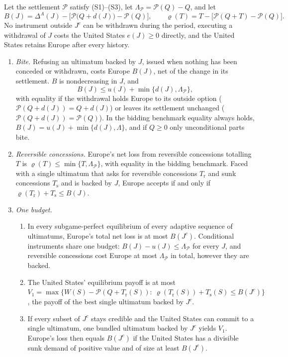 \begin{proposition}\label{prop:slack}
Let the settlement $\mathcal P$ satisfy (S1)--(S3), let $\Lambda_{\mathcal P}=\mathcal P(Q)-Q$, and let
\[
B(J)=\Delta^A(J)-\big[\mathcal P\big(Q+d(J)\big)-\mathcal P(Q)\big],\qquad \varrho(T)=T-\big[\mathcal P(Q+T)-\mathcal P(Q)\big].
\]
No instrument outside $J^c$ can be withdrawn during the period, executing a withdrawal of $J$ costs the United States $e(J)\ge 0$ directly, and the United States retains Europe after every history.
\begin{enumerate}[label=(\alph*)]
\item \emph{Bite.} Refusing an ultimatum backed by $J$, issued when nothing has been conceded or withdrawn, costs Europe $B(J)$, net of the change in its settlement. $B$ is nondecreasing in $J$, and
\[ B(J)\le u(J)+\min\{d(J),\Lambda_{\mathcal P}\}, \]
with equality if the withdrawal holds Europe to its outside option ($\mathcal P(Q+d(J))=Q+d(J)$) or leaves its settlement unchanged ($\mathcal P(Q+d(J))=\mathcal P(Q)$). In the bidding benchmark equality always holds, $B(J)=u(J)+\min\{d(J),\Lambda\}$, and if $Q\ge 0$ only unconditional parts bite.
\item \emph{Reversible concessions.} Europe's net loss from reversible concessions totalling $T$ is $\varrho(T)\le\min\{T,\Lambda_{\mathcal P}\}$, with equality in the bidding benchmark. Faced with a single ultimatum that asks for reversible concessions $T_{\mathrm r}$ and sunk concessions $T_{\mathrm s}$ and is backed by $J$, Europe accepts if and only if $\varrho(T_{\mathrm r})+T_{\mathrm s}\le B(J)$.
\item \emph{One budget.}
  \begin{enumerate}[label=(\roman*)]
  \item In every subgame-perfect equilibrium of every adaptive sequence of ultimatums, Europe's total net loss is at most $B(J^c)$. Conditional instruments share one budget: $B(J)-u(J)\le\Lambda_{\mathcal P}$ for every $J$, and reversible concessions cost Europe at most $\Lambda_{\mathcal P}$ in total, however they are backed.
  \item The United States' equilibrium payoff is at most
  $V_1=\max\{W(S)-\mathcal P(Q+T_{\mathrm r}(S)):\ \varrho(T_{\mathrm r}(S))+T_{\mathrm s}(S)\le B(J^c)\}$, the payoff of the best single ultimatum backed by $J^c$.
  \item If every subset of $J^c$ stays credible and the United States can commit to a single ultimatum, one bundled ultimatum backed by $J^c$ yields $V_1$. Europe's loss then equals $B(J^c)$ if the United States has a divisible sunk demand of positive value and of size at least $B(J^c)$.

\end{enumerate}
\end{enumerate}
\end{proposition}
